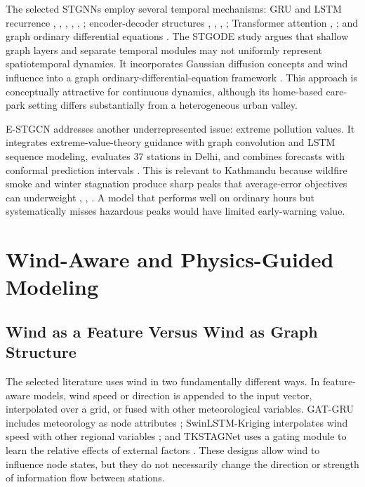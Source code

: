 The selected STGNNs employ several temporal mechanisms: GRU and LSTM recurrence \cite{ref13}, \cite{ref14}, \cite{ref16}, \cite{ref21}, \cite{ref23}, \cite{ref34}; encoder-decoder structures \cite{ref15}, \cite{ref21}, \cite{ref23}, \cite{ref25}; Transformer attention \cite{ref19}, \cite{ref20}; and graph ordinary differential equations \cite{ref22}. The STGODE study argues that shallow graph layers and separate temporal modules may not uniformly represent spatiotemporal dynamics. It incorporates Gaussian diffusion concepts and wind influence into a graph ordinary-differential-equation framework \cite{ref22}. This approach is conceptually attractive for continuous dynamics, although its home-based care-park setting differs substantially from a heterogeneous urban valley.

E-STGCN addresses another underrepresented issue: extreme pollution values. It integrates extreme-value-theory guidance with graph convolution and LSTM sequence modeling, evaluates 37 stations in Delhi, and combines forecasts with conformal prediction intervals \cite{ref33}. This is relevant to Kathmandu because wildfire smoke and winter stagnation produce sharp peaks that average-error objectives can underweight \cite{ref4}, \cite{ref6}, \cite{ref7}. A model that performs well on ordinary hours but systematically misses hazardous peaks would have limited early-warning value.

\section{Wind-Aware and Physics-Guided Modeling}

\subsection{Wind as a Feature Versus Wind as Graph Structure}

The selected literature uses wind in two fundamentally different ways. In feature-aware models, wind speed or direction is appended to the input vector, interpolated over a grid, or fused with other meteorological variables. GAT-GRU includes meteorology as node attributes \cite{ref13}; SwinLSTM-Kriging interpolates wind speed with other regional variables \cite{ref27}; and TKSTAGNet uses a gating module to learn the relative effects of external factors \cite{ref19}. These designs allow wind to influence node states, but they do not necessarily change the direction or strength of information flow between stations.

